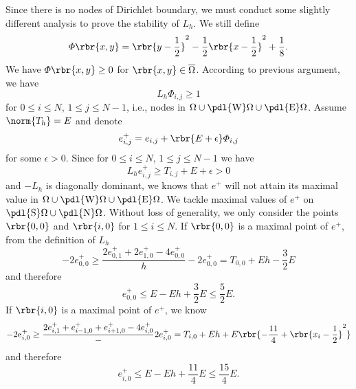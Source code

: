 \documentclass[english, nochinese]{pnote}
\begin{document}
Since there is no nodes of Dirichlet boundary, we must conduct some slightly different analysis to prove the stability of $L_h$. We still define
\begin{equation}
\varPhi \rbr{ x, y } = \rbr{ y - \frac{1}{2} }^2 - \frac{1}{2} \rbr{ x - \frac{1}{2} }^2 + \frac{1}{8}.
\end{equation}
We have $ \varPhi \rbr{ x, y } \ge 0 $ for $ \rbr{ x, y } \in \overline{\Omega} $. According to previous argument, we have
\begin{equation}
L_h \varPhi_{ i, j } \ge 1
\end{equation}
for $ 0 \le i \le N $, $ 1 \le j \le N - 1 $, i.e., nodes in $ \Omega \cup \pdl{\text{W}} \Omega \cup \pdl{\text{E}} \Omega $. Assume $ \norm{T_h} = E $ and denote
\begin{equation}
e^+_{ i, j } = e_{ i, j } + \rbr{ E + \epsilon } \varPhi_{ i, j }
\end{equation}
for some $ \epsilon > 0 $. Since for $ 0 \le i \le N $, $ 1 \le j \le N - 1 $ we have
\begin{equation}
L_h e^+_{ i, j } \ge T_{ i, j } + E + \epsilon > 0
\end{equation}
and $-L_h$ is diagonally dominant, we knows that $e^+$ will not attain its maximal value in $ \Omega \cup \pdl{\text{W}} \Omega \cup \pdl{\text{E}} \Omega $. We tackle maximal values of $e^+$ on $ \pdl{\text{S}} \Omega \cup \pdl{\text{N}} \Omega $. Without loss of generality, we only consider the points $ \rbr{ 0, 0 } $ and $ \rbr{ i, 0 } $ for $ 1 \le i \le N $. If $ \rbr{ 0, 0 } $ is a maximal point of $e^+$, from the definition of $L_h$
\begin{equation}
- 2 e^+_{ 0, 0 } \ge \frac{ 2 e^+_{ 0, 1 } + 2 e^+_{ 1, 0 } - 4 e^+_{ 0, 0 } }{h} - 2 e^+_{ 0, 0 } = T_{ 0, 0 } + E h - \frac{3}{2} E
\end{equation}
and therefore
\begin{equation}
e^+_{ 0, 0 } \le E - E h + \frac{3}{2} E \le \frac{5}{2} E.
\end{equation}
If $ \rbr{ i, 0 } $ is a maximal point of $e^+$, we know
\begin{equation}
-2 e^+_{ i, 0 } \ge  \frac{ 2 e^+_{ i, 1 } + e^+_{ i - 1, 0 } + e^+_{ i + 1, 0 } - 4 e^+_{ i, 0 } } - 2 e^+_{ i, 0 } = T_{ i, 0 } + E h + E \rbr{ -\frac{11}{4} + \rbr{ x_i - \frac{1}{2} }^2 }
\end{equation}
and therefore
\begin{equation}
e^+_{ i, 0 } \le E - E h + \frac{11}{4} E \le \frac{15}{4} E.
\end{equation}
\end{document}
